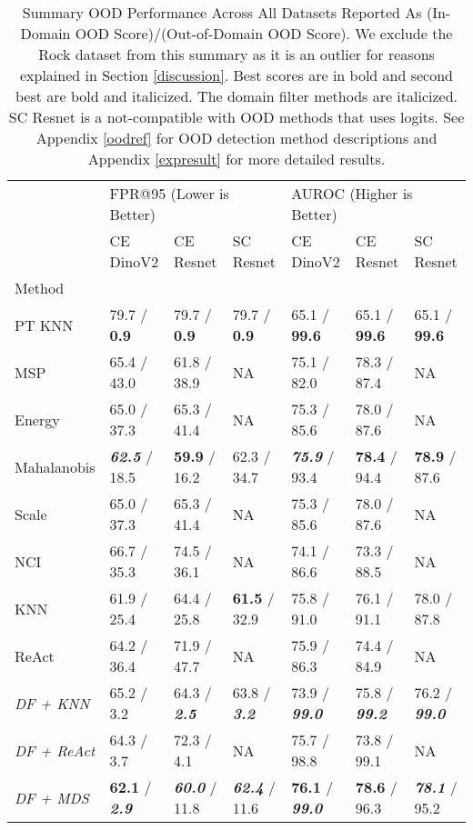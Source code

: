 \documentclass[letterpaper]{article} %
\theoremstyle{plain}
\theoremstyle{definition}
\theoremstyle{remark}
\begin{document}
\begin{table*}
\centering
\caption{Summary OOD Performance Across All Datasets Reported As (In-Domain OOD Score)/(Out-of-Domain OOD Score). We exclude the Rock dataset from this summary as it is an outlier for reasons explained in Section \ref{discussion}.  Best scores are in bold and second best are bold and italicized. The domain filter methods are italicized. SC Resnet is a not-compatible with OOD methods that uses logits.  See Appendix \ref{oodref} for OOD detection method descriptions and Appendix \ref{expresult} for more detailed results.}
\label{tab:summary}
\begin{tabular}{lllllll}
\toprule
 & \multicolumn{3}{l}{FPR@95 (Lower is Better)} & \multicolumn{3}{l}{AUROC (Higher is Better)} \\
 & CE DinoV2 & CE Resnet & SC Resnet & CE DinoV2 & CE Resnet & SC Resnet \\
Method &  &  &  &  &  &  \\
\midrule
PT KNN & 79.7 / \textbf{0.9} & 79.7 / \textbf{0.9}  & 79.7 / \textbf{0.9}  & 65.1 / \textbf{99.6} & 65.1 / \textbf{99.6} & 65.1 / \textbf{99.6} \\
MSP & 65.4 / 43.0 & 61.8 / 38.9 & NA & 75.1 / 82.0 & 78.3 / 87.4 & NA \\
Energy & 65.0 / 37.3 & 65.3 / 41.4 & NA & 75.3 / 85.6 & 78.0 / 87.6 & NA \\
Mahalanobis & \textbf{\textit{62.5}} / 18.5 & \textbf{59.9} / 16.2 & 62.3 / 34.7 & \textbf{\textit{75.9}} / 93.4 & \textbf{78.4} / 94.4 & \textbf{78.9} / 87.6 \\
Scale & 65.0 / 37.3 & 65.3 / 41.4 & NA & 75.3 / 85.6 & 78.0 / 87.6 & NA \\
NCI & 66.7 / 35.3 & 74.5 / 36.1 & NA & 74.1 / 86.6 & 73.3 / 88.5 & NA \\
KNN & 61.9 / 25.4 & 64.4 / 25.8 & \textbf{61.5} / 32.9 & 75.8 / 91.0 & 76.1 / 91.1 & 78.0 / 87.8 \\
ReAct & 64.2 / 36.4 & 71.9 / 47.7 & NA & 75.9 / 86.3 & 74.4 / 84.9 & NA \\
\textit{DF + KNN} & 65.2 / 3.2 & 64.3 / \textbf{\textit{2.5}} & 63.8 / \textbf{\textit{3.2}} & 73.9 / \textbf{\textit{99.0}} & 75.8 / \textbf{\textit{99.2}} & 76.2 / \textbf{\textit{99.0}} \\
\textit{DF + ReAct} & 64.3 / 3.7 & 72.3 / 4.1 & NA & 75.7 / 98.8 & 73.8 / 99.1 & NA \\
\textit{DF + MDS} & \textbf{62.1} / \textbf{\textit{2.9}} & \textbf{\textit{60.0}} / 11.8 & \textbf{\textit{62.4}} / 11.6 & \textbf{76.1} / \textbf{\textit{99.0}} & \textbf{78.6} / 96.3 & \textbf{\textit{78.1}} / 95.2 \\
\bottomrule
\end{tabular}
\end{table*}
\end{document}
